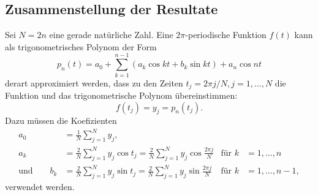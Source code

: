 \subsection{Zusammenstellung der Resultate}
Sei $N=2n$ eine gerade natürliche Zahl.
Eine $2\pi$-periodische Funktion $f(t)$ kann als trigonometrisches Polynom
der Form
\[
p_n(t)
=
a_0 + \sum_{k=1}^{n-1} (a_k\cos kt + b_k\sin kt) + a_n\cos nt
\]
derart approximiert werden, dass zu den Zeiten $t_j=2\pi j/N, j=1,\dots,N$ 
die Funktion und das trigonometrische Polynom übereinstimmen:
\[
f(t_j) = y_j = p_n(t_j).
\]
Dazu müssen die Koefizienten
\begin{align*}
a_0
&=
\frac{1}N
\sum_{j=1}^N y_j,
\\
a_k
&=
\frac{2}N
\sum_{j=1}^N y_j\cos t_j
=
\frac{2}N
\sum_{j=1}^N y_j\cos \frac{2\pi j}{N}&\text{für }k&=1,\dots,n
\\
\text{und}\qquad
b_k
&=
\frac{2}N
\sum_{j=1}^N y_j\sin t_j
=
\frac{2}N
\sum_{j=1}^N y_j\sin \frac{2\pi j}{N}&\text{für }k&=1,\dots,n-1,
\end{align*}
verwendet werden.

